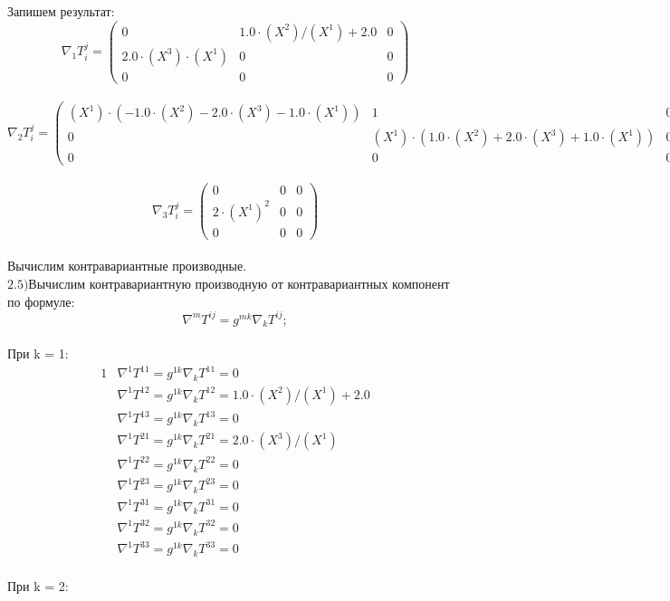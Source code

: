 \documentclass[a4paper, 12pt, oneside]{article}
\begin{document}
Запишем результат:\\
\[
\nabla_1T^j_i = \begin{pmatrix}
	0 & 1.0\cdot (X^2)/(X^1) + 2.0 & 0\\
	2.0\cdot (X^3)\cdot (X^1) & 0 & 0\\
	0 & 0 & 0
\end{pmatrix}
\]\\
\[
\nabla_2T^j_i = \begin{pmatrix}
	(X^1)\cdot (-1.0\cdot (X^2) - 2.0\cdot (X^3) - 1.0\cdot (X^1)) & 1 & 0\\
	0 & (X^1)\cdot (1.0\cdot (X^2) + 2.0\cdot (X^3) + 1.0\cdot (X^1)) & 0\\
	0 & 0 & 0
\end{pmatrix}
\]\\
\[
\nabla_3T^j_i = \begin{pmatrix}
	0 & 0 & 0\\
	2\cdot (X^1)^2 & 0 & 0\\
	0 & 0 & 0
\end{pmatrix}
\]\\
Вычислим контравариантные производные.\\
$\mathrm{2.5) }$Вычислим контравариантную производную от контравариантных компонент по формуле:\\
\[
\nabla^mT^{ij} = g^{mk}\nabla_kT^{ij};
\]\\
При k = 1:\\
\begin{alignat*}{1}
  & \nabla^1T^{11} = g^{1k}\nabla_kT^{11} = 0 \\
  & \nabla^1T^{12} = g^{1k}\nabla_kT^{12} = 1.0\cdot (X^2)/(X^1) + 2.0 \\
  & \nabla^1T^{13} = g^{1k}\nabla_kT^{13} = 0 \\
  & \nabla^1T^{21} = g^{1k}\nabla_kT^{21} = 2.0\cdot (X^3)/(X^1) \\
  & \nabla^1T^{22} = g^{1k}\nabla_kT^{22} = 0 \\
  & \nabla^1T^{23} = g^{1k}\nabla_kT^{23} = 0 \\
  & \nabla^1T^{31} = g^{1k}\nabla_kT^{31} = 0 \\
  & \nabla^1T^{32} = g^{1k}\nabla_kT^{32} = 0 \\
  & \nabla^1T^{33} = g^{1k}\nabla_kT^{33} = 0 
\end{alignat*}\\
При k = 2:\\
\end{document}
